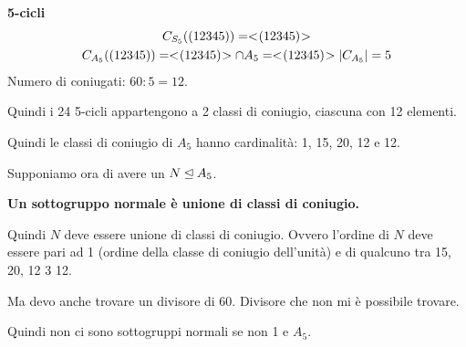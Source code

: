 \begin{dimostrazione}
	\textbf{5-cicli}
	\begin{gather*}
		C_{S_5}((12345)) = < \negmedspace (12345) \negmedspace > \\
		C_{A_5}((12345)) = < \negmedspace (12345) \negmedspace > \cap A_5 = < \negmedspace (12345) \negmedspace >
		\lvert C_{A_5} \rvert = 5
	\end{gather*}
	Numero di coniugati: $60:5 = 12$.

	Quindi i 24 5-cicli appartengono a 2 classi di coniugio, ciascuna con 12 elementi.

	Quindi le classi di coniugio di $A_5$ hanno cardinalità: 1, 15, 20, 12 e 12.

	Supponiamo ora di avere un $N \unlhd A_5$.

	\textbf{Un sottogruppo normale è unione di classi di coniugio.}

	Quindi $N$ deve essere unione di classi di coniugio.
	Ovvero l'ordine di $N$ deve essere pari ad 1 (ordine della
	classe di coniugio dell'unità) e di qualcuno tra 15, 20, 12 3 12.

	Ma devo anche trovare un divisore di 60.
	Divisore che non mi è possibile trovare.

	Quindi non ci sono sottogruppi normali se non 1 e $A_5$.
\end{dimostrazione}
